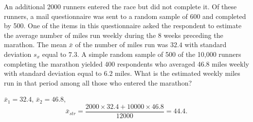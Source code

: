 \documentclass[12pt]{article}
\begin{document}
    \begin{exercise}[Levy-5.4]
        An additional 2000 runners entered the race but did not complete it. Of these runners, a mail questionnaire was sent to a random sample of 600 and completed by 500. One of the items in this questionnaire asked the respondent to estimate the average number of miles run weekly during the 8 weeks preceding the marathon. The mean $\bar{x}$ of the number of miles run was $32.4$ with standard deviation $s_x$ equal to $7.3$. A simple random sample of 500 of the 10,000 runners completing the marathon yielded 400 respondents who averaged 46.8 miles weekly with standard deviation equal to $6.2$ miles. What is the estimated weekly miles run in that period among all those who entered the marathon? 
    \end{exercise}

    \begin{solution}
        $\bar{x}_1=32.4$, $\bar{x}_2=46.8$, 
        \[
            \bar{x}_{str}=\frac{2000\times32.4+10000\times46.8}{12000}=44.4. 
        \]
    \end{solution}
\end{document}
